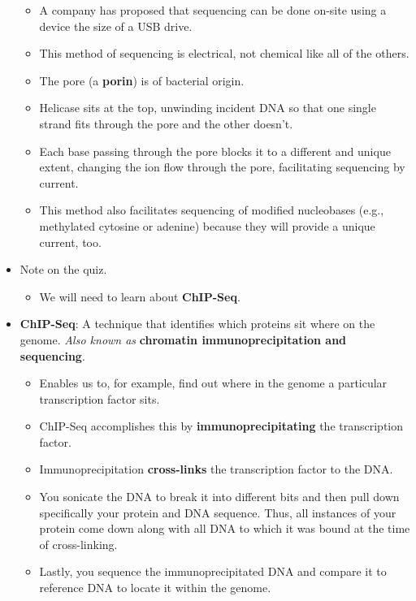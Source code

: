 \documentclass[../notes.tex]{subfiles}
\begin{document}
\begin{itemize}
\begin{figure}[h!]
    \end{figure}
    \begin{itemize}
        \item A company has proposed that sequencing can be done on-site using a device the size of a USB drive.
        \item This method of sequencing is electrical, not chemical like all of the others.
        \item The pore (a \textbf{porin}) is of bacterial origin.
        \item Helicase sits at the top, unwinding incident DNA so that one single strand fits through the pore and the other doesn't.
        \item Each base passing through the pore blocks it to a different and unique extent, changing the ion flow through the pore, facilitating sequencing by current.
        \item This method also facilitates sequencing of modified nucleobases (e.g., methylated cytosine or adenine) because they will provide a unique current, too.
    \end{itemize}
    \item Note on the quiz.
    \begin{itemize}
        \item We will need to learn about \textbf{ChIP-Seq}.
    \end{itemize}
    \item \textbf{ChIP-Seq}: A technique that identifies which proteins sit where on the genome. \emph{Also known as} \textbf{chromatin immunoprecipitation and sequencing}.
    \begin{itemize}
        \item Enables us to, for example, find out where in the genome a particular transcription factor sits.
        \item ChIP-Seq accomplishes this by \textbf{immunoprecipitating} the transcription factor.
        \item Immunoprecipitation \textbf{cross-links} the transcription factor to the DNA.
        \item You sonicate the DNA to break it into different bits and then pull down specifically your protein and DNA sequence. Thus, all instances of your protein come down along with all DNA to which it was bound at the time of cross-linking.
        \item Lastly, you sequence the immunoprecipitated DNA and compare it to reference DNA to locate it within the genome.
    \end{itemize}

\end{itemize}
\end{document}
